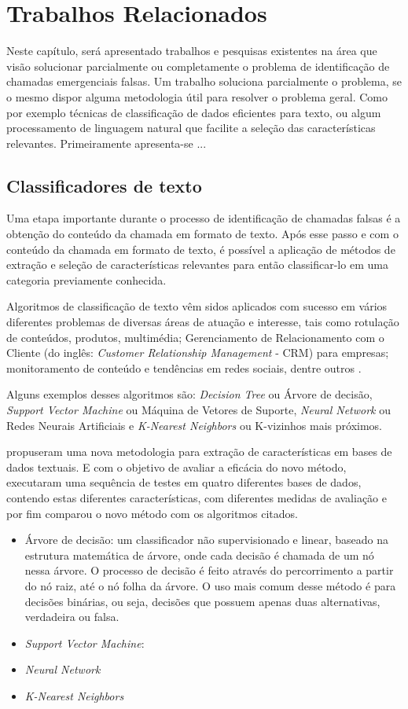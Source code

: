 \chapter{Trabalhos Relacionados}
Neste capítulo, será apresentado trabalhos e pesquisas existentes na área que visão solucionar parcialmente ou completamente o problema de identificação de chamadas emergenciais falsas. Um trabalho soluciona parcialmente o problema, se o mesmo dispor alguma metodologia útil para resolver o problema geral. Como por exemplo técnicas de classificação de dados eficientes para texto, ou algum processamento de linguagem natural que facilite a seleção das características relevantes. Primeiramente apresenta-se ...

\section{Classificadores de texto}
Uma etapa importante durante o processo de identificação de chamadas falsas é a obtenção do conteúdo da chamada em formato de texto. Após esse passo e com o conteúdo da chamada em formato de texto, é possível a aplicação de métodos de extração e seleção de características relevantes para então classificar-lo em uma categoria previamente conhecida.

Algoritmos de classificação de texto vêm sidos aplicados com sucesso em vários diferentes  problemas de diversas áreas de atuação e interesse, tais como rotulação de conteúdos, produtos, multimédia; Gerenciamento de Relacionamento com o Cliente (do inglês: \textit{Customer Relationship Management} - CRM) para empresas; monitoramento de conteúdo e tendências em redes sociais, dentre outros \citep{uysal2012novel, gupta2018text}.

Alguns exemplos desses algoritmos são: \textit{Decision Tree} ou Árvore de decisão, \textit{Support Vector Machine} ou Máquina de Vetores de Suporte, \textit{Neural Network} ou Redes Neurais Artificiais e \textit{K-Nearest Neighbors} ou K-vizinhos mais próximos. 

\cite{uysal2012novel} propuseram uma nova metodologia para extração de características em bases de dados textuais. E com o objetivo de avaliar a eficácia do novo método, executaram uma sequência de testes em quatro diferentes bases de dados, contendo estas diferentes características, com diferentes medidas de avaliação e por fim comparou o novo método com os algoritmos citados.

\begin{itemize}
    \item Árvore de decisão: um classificador não supervisionado e linear, baseado na estrutura matemática de árvore, onde cada decisão é chamada de um nó nessa árvore. O processo de decisão é feito através do percorrimento a partir do nó raiz, até o nó folha da árvore. O uso mais comum desse método é para decisões binárias, ou seja, decisões que possuem apenas duas alternativas, verdadeira ou falsa.
    \item \textit{Support Vector Machine}:
    \item \textit{Neural Network}
    \item \textit{K-Nearest Neighbors}
\end{itemize}

